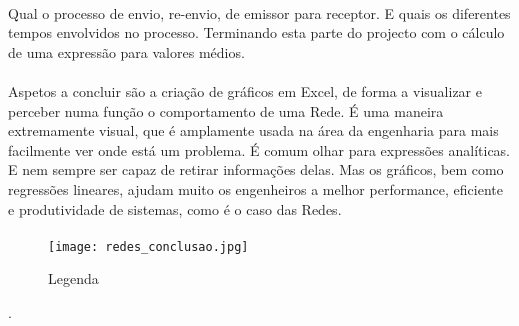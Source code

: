 \documentclass[13pt,a4paper]{report}
\begin{document}
\paragraph{}
Qual o processo de envio, re-envio, de emissor para receptor. E quais os diferentes tempos envolvidos no processo. Terminando esta parte do projecto com o cálculo de uma expressão para valores médios.

\paragraph{}
Aspetos a concluir são a criação de gráficos em Excel, de forma a visualizar e perceber numa função o comportamento de uma Rede. É uma maneira extremamente visual, que é amplamente usada na área da engenharia para mais facilmente ver onde está um problema. É comum olhar para expressões analíticas. E nem sempre ser capaz de retirar informações delas. Mas os gráficos, bem como regressões lineares, ajudam muito os engenheiros a melhor performance, eficiente e produtividade de sistemas, como é o caso das Redes.

\paragraph{}
\begin{figure}[!htp]
\centering
\texttt{[image: redes\_conclusao.jpg]}  
\caption{Legenda}
\end{figure}



.
\end{document}
